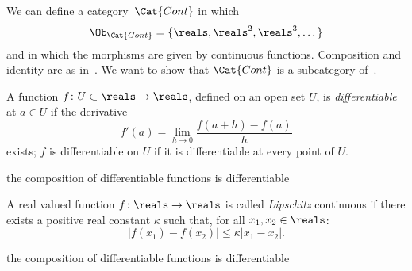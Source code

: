 {    \begin{example}
        We can define a category~$\Cat{Cont}$ in which~
        \begin{equation}
            \Ob_\Cat{Cont}=\{\reals, \reals^2, \reals^3, \dots \}
        \end{equation}
            and in which the morphisms are given by continuous functions.
        Composition and identity are as in~\Set.
        We want to show that $\Cat{Cont}$ is a subcategory of~\Set.
    \end{example}
    

    \begin{definition}
        A function $f\colon U\subset \reals\to \reals$, defined on an open set $U$, is \emph{differentiable} at $a\in U$ if the derivative
        \begin{equation}
            f'(a)=\lim_{h\to 0} \frac{f(a+h)-f(a)}{h}
        \end{equation}
        exists; $f$ is differentiable on $U$ if it is differentiable at every point of $U$.
    \end{definition}

    \begin{example}
        the composition of differentiable functions is differentiable
    \end{example}


    \begin{definition}
        A real valued function $f\colon \reals\to \reals$ is called \emph{Lipschitz} continuous if there exists a positive real constant $\kappa$ such that, for all $x_1,x_2\in \reals$:
        \begin{equation}
            \vert f(x_1)-f(x_2)\vert \leq \kappa \vert x_1-x_2\vert.
        \end{equation}
    \end{definition}

    \begin{example}
        the composition of differentiable functions is differentiable
    \end{example}


}
